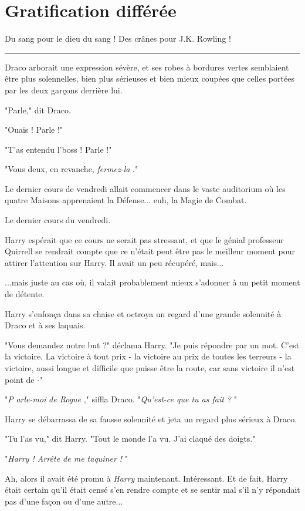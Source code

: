 
\chapter{Gratification différée}

Du sang pour le dieu du sang ! Des crânes pour J.K. Rowling !
\par\noindent\rule{\textwidth}{0.4pt}
Draco arborait une expression sévère, et ses robes à bordures vertes semblaient être plus solennelles, bien plus sérieuses et bien mieux coupées que celles portées par les deux garçons derrière lui.

"Parle," dit Draco.

"Ouais ! Parle !"

"T'as entendu l'boss ! Parle !"

"Vous deux, en revanche, \emph{fermez-la} ."

Le dernier cours de vendredi allait commencer dans le vaste auditorium où les quatre Maisons apprenaient la Défense... euh, la Magie de Combat.

Le dernier cours du vendredi.

Harry espérait que ce cours ne serait pas stressant, et que le génial professeur Quirrell se rendrait compte que ce n'était peut être pas le meilleur moment pour attirer l'attention sur Harry. Il avait un peu récupéré, mais...

...mais juste au cas où, il valait probablement mieux s'adonner à un petit moment de détente.

Harry s'enfonça dans sa chaise et octroya un regard d'une grande solennité à Draco et à ses laquais.

"Vous demandez notre but ?" déclama Harry. "Je puis répondre par un mot. C'est la victoire. La victoire à tout prix - la victoire au prix de toutes les terreurs - la victoire, aussi longue et difficile que puisse être la route, car sans victoire il n'est point de -"

"\emph{P} \emph{arle-moi} \emph{ de Rogue} ," siffla Draco. "\emph{Qu'est-ce que tu as fait ?} "

Harry se débarrassa de sa fausse solennité et jeta un regard plus sérieux à Draco.

"Tu l'as vu," dit Harry. "Tout le monde l'a vu. J'ai claqué des doigts."

"\emph{Harry ! Arrête de me taquiner !} "

Ah, alors il avait été promu à \emph{Harry}  maintenant. Intéressant. Et de fait, Harry était certain qu'il était censé s'en rendre compte et se sentir mal s'il n'y répondait pas d'une façon ou d'une autre...

